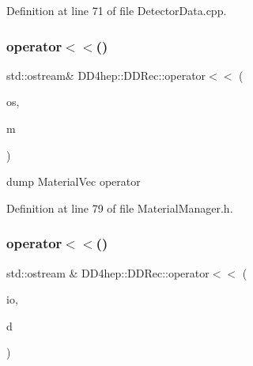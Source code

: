 Definition at line 71 of file Detector\+Data.\+cpp.

\hypertarget{namespace_d_d4hep_1_1_d_d_rec_a8e4fdb5e46547f315ba9b683d2b9e0e7}{}\label{namespace_d_d4hep_1_1_d_d_rec_a8e4fdb5e46547f315ba9b683d2b9e0e7} 
\subsubsection{\texorpdfstring{operator$<$$<$()}{operator<<()}\hspace{0.1cm}{\footnotesize\ttfamily [5/7]}}
{\footnotesize\ttfamily std\+::ostream\& D\+D4hep\+::\+D\+D\+Rec\+::operator$<$$<$ (\begin{DoxyParamCaption}\item[{std\+::ostream \&}]{os,  }\item[{const \hyperlink{namespace_d_d4hep_1_1_d_d_rec_a69fdab2f851316d2b9e50956920359f7}{Material\+Vec} \&}]{m }\end{DoxyParamCaption})\hspace{0.3cm}{\ttfamily [inline]}}



dump Material\+Vec operator 



Definition at line 79 of file Material\+Manager.\+h.

\hypertarget{namespace_d_d4hep_1_1_d_d_rec_ae4c258c58c53ab806bedda2948d0acca}{}\label{namespace_d_d4hep_1_1_d_d_rec_ae4c258c58c53ab806bedda2948d0acca} 
\subsubsection{\texorpdfstring{operator$<$$<$()}{operator<<()}\hspace{0.1cm}{\footnotesize\ttfamily [6/7]}}
{\footnotesize\ttfamily std\+::ostream \& D\+D4hep\+::\+D\+D\+Rec\+::operator$<$$<$ (\begin{DoxyParamCaption}\item[{std\+::ostream \&}]{io,  }\item[{const \hyperlink{namespace_d_d4hep_1_1_d_d_rec_ad032e209cba53400573169b32816f1c9}{Conical\+Support\+Data} \&}]{d }\end{DoxyParamCaption})}



